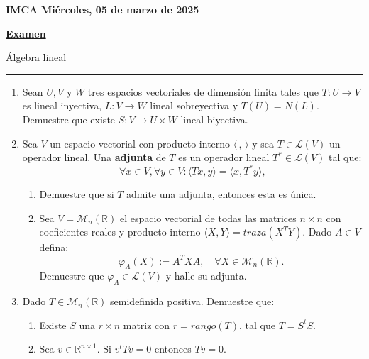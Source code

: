 \documentclass{article}
\begin{document}
\textbf{IMCA} \hfill\textbf{ Miércoles, 05 de marzo de 2025}

\vspace{0.5cm}

\begin{center}
	\large
	\underline{	\textbf{Examen} }
\end{center}

Álgebra lineal

\rule{\textwidth}{0.3mm}

\begin{enumerate}
	\item Sean \( U, V \) y \( W \) tres espacios vectoriales de dimensión finita tales que \( T : U \rightarrow V \) es lineal inyectiva, \( L : V \rightarrow W \) lineal sobreyectiva y \( T(U) = N(L) \). Demuestre que existe \( S : V \rightarrow U \times W \) lineal biyectiva.

	\item Sea \( V \) un espacio vectorial con producto interno \(\langle \,,\, \rangle\) y sea \( T \in \mathcal{L}(V) \) un operador lineal. Una \textbf{adjunta} de \( T \) es un operador lineal \( T^* \in \mathcal{L}(V) \) tal que:
	      \[
		      \forall x \in V, \forall y \in V : \langle Tx, y \rangle = \langle x, T^* y \rangle,
	      \]
	      \begin{enumerate}[label=\alph*)]
		      \item Demuestre que si \( T \) admite una adjunta, entonces esta es única.
		      \item Sea \( V = \mathcal{M}_n(\mathbb{R}) \) el espacio vectorial de todas las matrices \( n \times n \) con coeficientes reales y producto interno \(\langle X, Y \rangle = traza(X^TY)\). Dado \( A \in V \) defina:
		            \[
			            \varphi_A(X) := A^TXA, \quad \forall X \in \mathcal{M}_n(\mathbb{R}).
		            \]
		            Demuestre que \(\varphi_A \in \mathcal{L}(V)\) y halle su adjunta.
	      \end{enumerate}

	\item Dado \( T \in \mathcal{M}_n(\mathbb{R}) \) semidefinida positiva. Demuestre que:
	      \begin{enumerate}[label=\alph*)]
		      \item Existe \( S \) una \( r \times n \) matriz con \( r = rango(T) \), tal que \( T = S^tS \).
		      \item Sea \( v \in \mathbb{R}^{n \times 1} \). Si \( v^tTv = 0 \) entonces \( Tv = 0 \).
	      \end{enumerate}


\end{enumerate}
\end{document}
